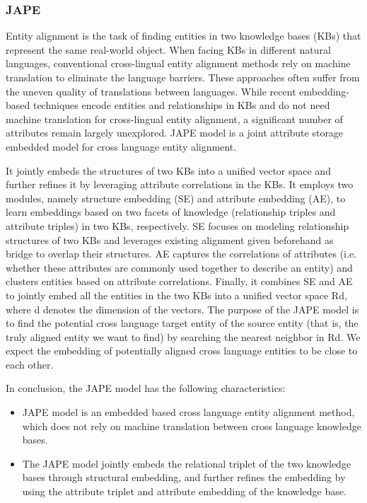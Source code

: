 \documentclass[sigconf]{acmart}
\begin{document}
{\subsubsection{JAPE \cite{sun2017cross}}

Entity alignment is the task of finding entities in two knowledge bases (KBs) that represent the same real-world object. When facing KBs in different natural languages, conventional cross-lingual entity alignment methods rely on machine translation to eliminate the language barriers. These approaches often suffer from the uneven quality of translations between languages. While recent embedding-based techniques encode entities and relationships in KBs and do not need machine translation for cross-lingual entity alignment, a significant number of attributes remain largely unexplored. JAPE model is a joint attribute storage embedded model for cross language entity alignment.

It jointly embeds the structures of two KBs into a unified vector space and further refines it by leveraging attribute correlations in the KBs. It employs two modules, namely structure embedding (SE) and attribute embedding (AE), to learn embeddings based on two facets of knowledge (relationship triples and attribute triples) in two KBs, respectively. SE focuses on modeling relationship structures of two KBs and leverages existing alignment given beforehand as bridge to overlap their structures. AE captures the correlations of attributes (i.e. whether these attributes are commonly used together to describe an entity) and clusters entities based on attribute correlations. Finally, it combines SE and AE to jointly embed all the entities in the two KBs into a unified vector space Rd, where d denotes the dimension of the vectors. The purpose of the JAPE model is to find the potential cross language target entity of the source entity (that is, the truly aligned entity we want to find) by searching the nearest neighbor in Rd. We expect the embedding of potentially aligned cross language entities to be close to each other.

In conclusion, the JAPE model has the following characteristics:
\begin{itemize}
\item JAPE model is an embedded based cross language entity alignment method, which does not rely on machine translation between cross language knowledge bases.
\item The JAPE model jointly embeds the relational triplet of the two knowledge bases through structural embedding, and further refines the embedding by using the attribute triplet and attribute embedding of the knowledge base.
\end{itemize}

}
\end{document}
